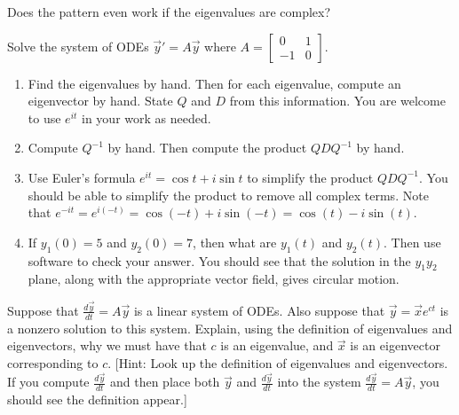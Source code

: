 Does the pattern even work if the eigenvalues are complex?
\begin{problem}
 Solve the system of ODEs $\vec y '=A\vec y$ where 
$A
=\begin{bmatrix}
  0&1\\-1&0
 \end{bmatrix}
$. 
\begin{enumerate}
 \item Find the eigenvalues by hand.  Then for each eigenvalue, compute an eigenvector by hand. State $Q$ and $D$ from this information.  You are welcome to use $e^{it}$ in your work as needed. 
 \item Compute $Q^{-1}$ by hand.  Then compute the product $QDQ^{-1}$ by hand.
 \item 
{}%
Use Euler's formula $e^{it} = \cos t +i\sin t$ to simplify the product $QDQ^{-1}$. You should be able to simplify the product to remove all complex terms. Note that $e^{-it}=e^{i(-t)} = \cos(-t) +i\sin(-t)=\cos(t)-i\sin(t)$.
 \item 
{}%
If $y_1(0)=5$ and $y_2(0)=7$, then what are $y_1(t)$ and $y_2(t)$. Then use software to check your answer. You should see that the solution in the $y_1y_2$ plane, along with the appropriate vector field, gives circular motion.
\end{enumerate}

\end{problem}

\begin{problem}
Suppose that $\frac{d\vec y}{dt} = A\vec y$ is a linear system of ODEs.  Also suppose that $\vec y=\vec x e^{ct}$ is a nonzero solution to this system. Explain, using the definition of eigenvalues and eigenvectors, why we must have that $c$ is an eigenvalue, and $\vec x$ is an eigenvector corresponding to $c$. [Hint:  Look up the definition of eigenvalues and eigenvectors.  If you compute $\frac{d\vec y}{dt}$ and then place both $\vec y$ and $\frac{d\vec y}{dt}$ into the system $\frac{d\vec y}{dt}= A\vec y$, you should see the definition appear.] 
\end{problem}













